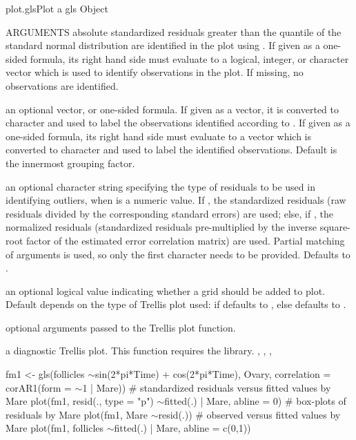 \documentclass[pdftex]{article} \usepackage{url,graphicx}
\renewcommand{\Twiddle}{\mbox{\(\sim\)}}
\begin{document}
\begin{Helpfile}{plot.gls}{Plot a gls Object}
\begin{Argument}{ARGUMENTS}
absolute standardized residuals greater than the 
quantile of the standard normal distribution are identified in the
plot using . If given as a one-sided formula, its
right hand side must evaluate to a  logical, integer, or character
vector which is used to identify observations in the plot. If
missing, no observations are identified.
\item[\Co{idLabels:}]
an optional vector, or one-sided formula. If given as a
vector, it is converted to character and used to label the
observations identified according to . If given as a
one-sided formula, its right hand side must evaluate to a vector
which is converted to character and used to label the identified
observations. Default is the innermost grouping factor. 
\item[\Co{idResType:}]
an optional character string specifying the type of
residuals to be used in identifying outliers, when  is a
numeric value. If , the standardized residuals (raw 
residuals divided by the corresponding standard errors) are used;
else, if , the normalized residuals (standardized
residuals pre-multiplied by the inverse square-root factor of the
estimated error correlation matrix) are used. Partial matching of
arguments is used, so only the first character needs to be
provided. Defaults to .
\item[\Co{grid:}]
an optional logical value indicating whether a grid should
be added to plot. Default depends on the type of Trellis plot used:
if  defaults to , else defaults to
.
\item[\Co{...:}]
optional arguments passed to the Trellis plot function.
\end{Argument}
a diagnostic Trellis plot.
 This function requires the  library.
, , ,
\need 15pt
\vspace{-16pt} 
\begin{Example}
fm1 <- gls(follicles \Twiddle sin(2*pi*Time) + cos(2*pi*Time), Ovary,
           correlation = corAR1(form = \Twiddle 1 | Mare))
# standardized residuals versus fitted values by Mare
plot(fm1, resid(., type = "p") \Twiddle fitted(.) | Mare, abline = 0)
# box-plots of residuals by Mare
plot(fm1, Mare \Twiddle resid(.))
# observed versus fitted values by Mare
plot(fm1, follicles \Twiddle fitted(.) | Mare, abline = c(0,1))
\end{Example}
\end{Helpfile}
\end{document}
